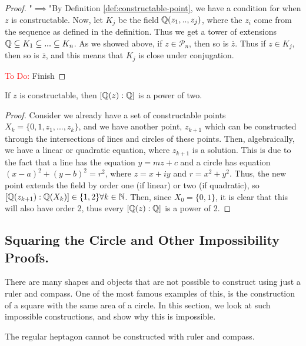 \begin{proof}
    "$\implies$"By Definition \ref{def:constructable-point}, we have a condition for when $z$ is constructable. Now, let $K_j$ be the field $\mathbb Q(z_1,..,z_j)$, where the $z_i$ come from the sequence as defined in the definition. Thus we get a tower of extensions $\mathbb Q \subseteq K_1 \subseteq ... \subseteq K_n$.
    As we showed above, if $z\in \mathcal{P}_n$, then so is $\overline{z}$. Thus if $z\in K_j$, then so is $\overline{z}$, and this means that $K_j$ is close under conjugation.

    \textcolor{red}{To Do:} Finish
\end{proof}

\begin{theorem}\label{thm:power-of-two-construction}
    If $z$ is constructable, then $[\mathbb Q(z):\mathbb Q]$ is a power of two.
\end{theorem}

\begin{proof}  
    Consider we already have a set of constructable points $X_k = \{0,1,z_1,...,z_k\}$, and we have another point, $z_{k+1}$ which can be constructed through the intersections of lines and circles of these points. Then, algebraically, we have a linear or quadratic equation, where $z_{k+1}$ is a solution. This is due to the fact that a line has the equation $y=mz+c$ and a circle has equation $(x-a)^2+(y-b)^2=r^2$, where $z=x+iy$ and $r=x^2+y^2$. Thus, the new point extends the field by order one (if linear) or two (if quadratic), so $[\mathbb Q(z_{k+1}):\mathbb Q(X_k)] \in \{1,2\} \forall k \in \mathbb N$. Then, since $X_0=\{0,1\}$, it is clear that this will also have order 2, thus every $[\mathbb Q(z):\mathbb Q]$ is a power of 2.

\end{proof}

\subsection{Squaring the Circle and Other Impossibility Proofs.}

There are many shapes and objects that are not possible to construct using just a ruler and compass. One of the most famous examples of this, is the construction of a square with the same area of a circle. In this section, we look at such impossible constructions, and show why this is impossible.

\begin{theorem}
    The regular heptagon cannot be constructed with ruler and compass.
\end{theorem}

